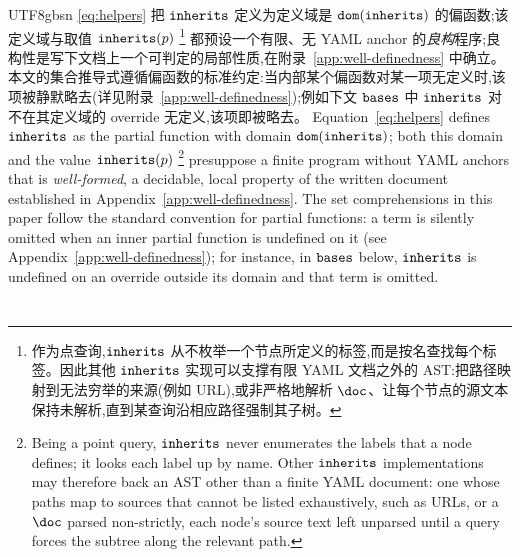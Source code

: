 \begin{CJK*}{UTF8}{gbsn}
\ifPaperChinese
\eqref{eq:helpers} 把 $\mathtt{inherits}$ 定义为定义域是 $\mathtt{dom}(\mathtt{inherits})$ 的偏函数;该定义域与取值 $\mathtt{inherits}(p)$%
\footnote{作为点查询,$\mathtt{inherits}$ 从不枚举一个节点所定义的标签,而是按名查找每个标签。因此其他 $\mathtt{inherits}$ 实现可以支撑有限 YAML 文档之外的 AST:把路径映射到无法穷举的来源(例如 URL),或非严格地解析 $\doc$、让每个节点的源文本保持未解析,直到某查询沿相应路径强制其子树。}
都预设一个有限、无 YAML anchor 的\emph{良构}程序;良构性是写下文档上一个可判定的局部性质,在附录~\ref{app:well-definedness} 中确立。本文的集合推导式遵循偏函数的标准约定:当内部某个偏函数对某一项无定义时,该项被静默略去(详见附录~\ref{app:well-definedness});例如下文 $\mathtt{bases}$ 中 $\mathtt{inherits}$ 对不在其定义域的 override 无定义,该项即被略去。
\else
Equation~\eqref{eq:helpers} defines $\mathtt{inherits}$ as the partial function with domain $\mathtt{dom}(\mathtt{inherits})$; both this domain and the value $\mathtt{inherits}(p)$%
\footnote{Being a point query, $\mathtt{inherits}$ never enumerates the labels that a node defines; it looks each label up by name. Other $\mathtt{inherits}$ implementations may therefore back an AST other than a finite YAML document: one whose paths map to sources that cannot be listed exhaustively, such as URLs, or a $\doc$ parsed non-strictly, each node's source text left unparsed until a query forces the subtree along the relevant path.}
presuppose a finite program without YAML anchors that is \emph{well-formed}, a decidable, local property of the written document established in Appendix~\ref{app:well-definedness}.
The set comprehensions in this paper follow the standard convention for partial functions: a term is silently omitted when an inner partial function is undefined on it (see Appendix~\ref{app:well-definedness}); for instance, in $\mathtt{bases}$ below, $\mathtt{inherits}$ is undefined on an override outside its domain and that term is omitted.
\fi

\section{}
\label{sec:mixin-trees}


\end{CJK*}
